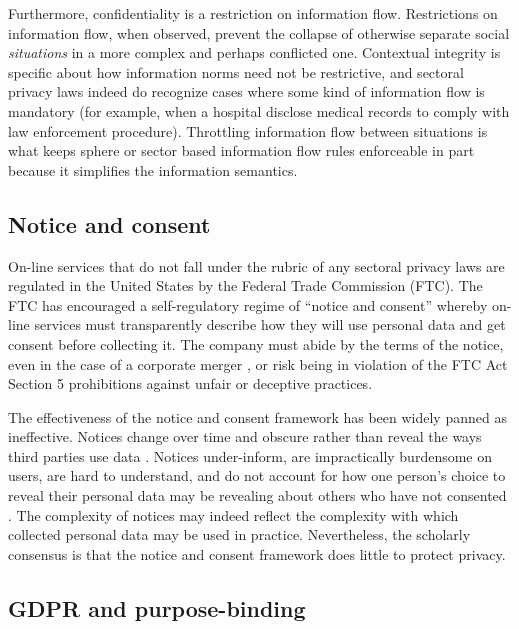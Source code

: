 \documentclass[../thesis.tex]{subfiles}
\begin{document}
Furthermore, confidentiality is a restriction on
information flow.
Restrictions on information flow, when observed,
prevent the collapse of otherwise separate
social \emph{situations} in a more complex and
perhaps conflicted one.
Contextual integrity is specific about
how information norms need not be restrictive,
and sectoral privacy laws indeed do recognize
cases where some kind of information flow
is mandatory (for example, when a hospital
disclose medical records to comply with
law enforcement procedure).
Throttling information flow between situations is
what keeps sphere or sector based information flow
rules enforceable in part because it simplifies
the information semantics.

\subsection{Notice and consent}

On-line services that do
not fall under the rubric of any sectoral privacy
laws are regulated in the United States by the
Federal Trade Commission (FTC).
The FTC has encouraged a self-regulatory regime
of ``notice and consent'' whereby on-line services
must transparently describe how they will use
personal data and get consent before collecting it.
The company must abide by the terms of the notice,
even in the case of a corporate merger \cite{hine_2015},
or risk being in violation of the FTC Act Section 5
prohibitions against unfair or deceptive practices. 

The effectiveness of the notice and consent framework
has been widely panned as ineffective.
Notices change over time and obscure rather than reveal
the ways third parties use data \cite{barocas2009notice}.
Notices under-inform, are impractically burdensome on users,
are hard to understand, and do not account for how
one person's choice to reveal their personal data
may be revealing about others who have not consented
\cite{reidenberg2015privacy} \cite{solove2012introduction}.
The complexity of notices may indeed reflect the complexity
with which collected personal data may be used
\cite{schaub2015design} in practice.
Nevertheless, the scholarly consensus is that
the notice and consent framework does little to
protect privacy.

\subsection{GDPR and purpose-binding}
\label{sec:GDPR}
\end{document}
